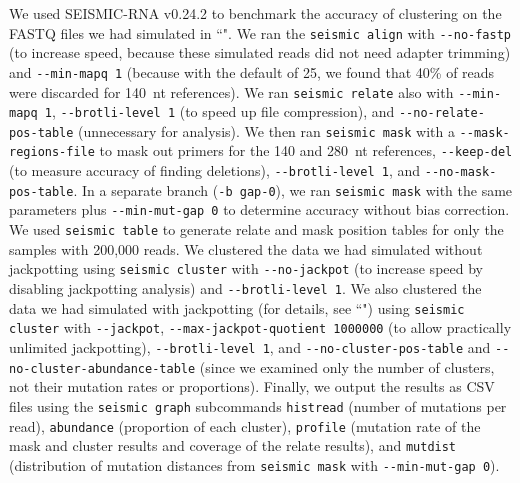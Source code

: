 \documentclass[11pt]{article}
\begin{document}
We used SEISMIC-RNA v0.24.2 to benchmark the accuracy of clustering on the FASTQ files we had simulated in ``".
We ran the \verb|seismic align| with \verb|--no-fastp| (to increase speed, because these simulated reads did not need adapter trimming) and \verb|--min-mapq 1| (because with the default of 25, we found that 40\% of reads were discarded for 140~nt references).
We ran \verb|seismic relate| also with \verb|--min-mapq 1|, \verb|--brotli-level 1| (to speed up file compression), and \verb|--no-relate-pos-table| (unnecessary for analysis).
We then ran \verb|seismic mask| with a \verb|--mask-regions-file| to mask out primers for the 140 and 280~nt references, \verb|--keep-del| (to measure accuracy of finding deletions), \verb|--brotli-level 1|, and \verb|--no-mask-pos-table|.
In a separate branch (\verb|-b gap-0|), we ran \verb|seismic mask| with the same parameters plus \verb|--min-mut-gap 0| to determine accuracy without bias correction.
We used \verb|seismic table| to generate relate and mask position tables for only the samples with 200,000 reads.
We clustered the data we had simulated without jackpotting using \verb|seismic cluster| with \verb|--no-jackpot| (to increase speed by disabling jackpotting analysis) and \verb|--brotli-level 1|.
We also clustered the data we had simulated with jackpotting (for details, see ``") using \verb|seismic cluster| with \verb|--jackpot|, \verb|--max-jackpot-quotient 1000000| (to allow practically unlimited jackpotting), \verb|--brotli-level 1|, and \verb|--no-cluster-pos-table| and \verb|--no-cluster-abundance-table| (since we examined only the number of clusters, not their mutation rates or proportions).
Finally, we output the results as CSV files using the \verb|seismic graph| subcommands \verb|histread| (number of mutations per read), \verb|abundance| (proportion of each cluster), \verb|profile| (mutation rate of the mask and cluster results and coverage of the relate results), and \verb|mutdist| (distribution of mutation distances from \verb|seismic mask| with \verb|--min-mut-gap 0|).
\end{document}
